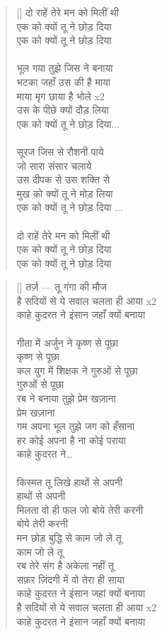 \begin{verse}[\versewidth]\texthindi{
दो राहें तेरे मन को मिलीं थी\\
एक को क्यों तू ने छोड़ दिया\\
एक को क्यों तू ने छोड़ दिया\\
\\
भूल गया तुझे जिस ने बनाया\\
भटका जहाँ उस की है माया\\
माया मृग छाया है भोले x2\\
उस के पीछे क्यों दौड़ लिया\\
एक को क्यों तू ने छोड़ दिया...\\
\\
सूरज जिस से रौशनी पाये\\
जो सारा संसार चलाये\\
उस दीपक से उस शक्ति से\\
मुख को क्यों तू ने मोड़ लिया\\
एक को क्यों तू ने छोड़ दिया ...\\
\\
दो राहें तेरे मन को मिलीं थी\\
एक को क्यों तू ने छोड़ दिया\\
एक को क्यों तू ने छोड़ दिया
}
\end{verse}

\begin{verse}[\versewidth]\texthindi{
तर्ज़ — तू गंगा की मौज\\
है सदियों से ये सवाल चलता ही आया x2\\
काहे कुदरत ने इंसान जहाँ क्यों बनाया\\
\\
गीता में अर्जुन ने कृष्ण से पूछा\\
कृष्ण से पूछा\\
कल युग में शिक्षक ने गुरुओं से पूछा\\
गुरुओं से पूछा\\
रब ने बनाया तुझे प्रेम खज़ाना\\
प्रेम खज़ाना\\
गम अपना भूल तुझे जग को हँसाना\\
हर कोई अपना है ना कोई पराया\\
काहे कुदरत ने…\\
\\
किस्मत तू लिखे हाथों से अपनी\\
हाथों से अपनी\\
मिलता वो ही फल जो बोये तेरी करनी\\
बोये तेरी करनी\\
मन छोड़ बुद्धि से काम जो ले तू\\
काम जो ले तू\\
रब तेरे संग है अकेला नहीं तू\\
सफ़र ज़िंदगी में वो तेरा ही साया\\
काहे कुदरत ने इंसान जहां क्यों बनाया\\
है सदियों से ये सवाल चलता ही आया x2\\
काहे कुदरत ने इंसान जहाँ क्यों बनाया
}
\end{verse}

